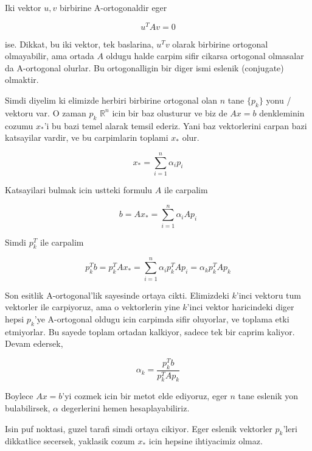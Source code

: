 \documentclass[12pt,fleqn]{article}\usepackage{../common}
\begin{document}
Iki vektor $u,v$ birbirine A-ortogonaldir eger

\[ u^TAv = 0 \] 

ise. Dikkat, bu iki vektor, tek baslarina, $u^Tv$ olarak birbirine
ortogonal olmayabilir, ama ortada $A$ oldugu halde carpim sifir cikarsa
ortogonal olmasalar da A-ortogonal olurlar. Bu ortogonalligin bir diger
ismi eslenik (conjugate) olmaktir.

Simdi diyelim ki elimizde herbiri birbirine ortogonal olan $n$ tane
$\{p_k\}$ yonu / vektoru var. O zaman $p_k$ $\mathbb{R}^n$ icin bir baz
olusturur ve biz de $Ax = b$ denkleminin cozumu $x_*$'i bu bazi temel
alarak temsil ederiz. Yani baz vektorlerini carpan bazi katsayilar vardir,
ve bu carpimlarin toplami $x_*$ olur. 

\[ x_* = \sum _{ i=1}^{n} \alpha_i p_i \]

Katsayilari bulmak icin ustteki formulu $A$ ile carpalim

\[ b = A x_* = \sum _{ i=1}^{n} \alpha_i A p_i \]

Simdi $p_k^T$ ile carpalim

\[
p_k^Tb = p_k^TA x_* = 
\sum _{ i=1}^{n} \alpha_i p_k^T A p_i = 
\alpha_k p_k^T A p_k \]

Son esitlik A-ortogonal'lik sayesinde ortaya cikti. Elimizdeki $k$'inci
vektoru tum vektorler ile carpiyoruz, ama o vektorlerin yine $k$'inci
vektor haricindeki diger hepsi $p_k$'ye A-ortogonal oldugu icin carpimda
sifir oluyorlar, ve toplama etki etmiyorlar. Bu sayede toplam ortadan
kalkiyor, sadece tek bir caprim kaliyor. Devam edersek,

\[ \alpha_k = \frac{p_k^Tb}{p_k^T A p_k} \]

Boylece $Ax = b$'yi cozmek icin bir metot elde ediyoruz, eger $n$ tane
eslenik yon bulabilirsek, $\alpha$ degerlerini hemen hesaplayabiliriz. 

Isin puf noktasi, guzel tarafi simdi ortaya cikiyor. Eger eslenik vektorler
$p_k$'leri dikkatlice secersek, yaklasik cozum $x_*$ icin hepsine
ihtiyacimiz olmaz. 


\end{document}
